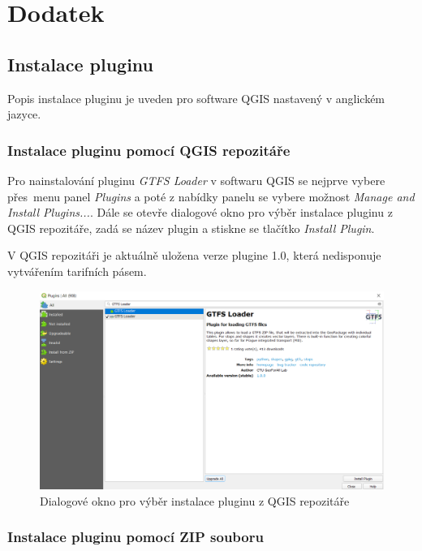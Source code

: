\chapter{Dodatek}
\label{dodatek}

\section{Instalace pluginu}

Popis instalace pluginu je uveden pro software QGIS nastavený v anglickém jazyce. 

\subsection{Instalace pluginu pomocí QGIS repozitáře}

Pro nainstalování pluginu \textit{GTFS Loader} v softwaru QGIS se nejprve vybere přes~me\-nu 
panel \textit{Plugins} a poté z nabídky panelu se vybere možnost \textit{Manage and Install Plugins...}.
Dále se otevře dialogové okno pro výběr instalace pluginu z QGIS repozitáře, zadá se název
plugin a stiskne se tlačítko \textit{Install Plugin}.

V QGIS repozitáři je aktuálně uložena verze plugine 1.0, která nedisponuje vytvářením
tarifních pásem.  

\begin{figure}[H] \centering
    \includegraphics[width=400pt]{./pictures-dodatek/repositary.png}
    \caption[Dialogové okno pro výběr instalace pluginu z QGIS repozitáře]{Dialogové okno pro výběr instalace pluginu z QGIS repozitáře}
	\label{fig:repositary}              
\end{figure} 

\subsection{Instalace pluginu pomocí ZIP souboru}

